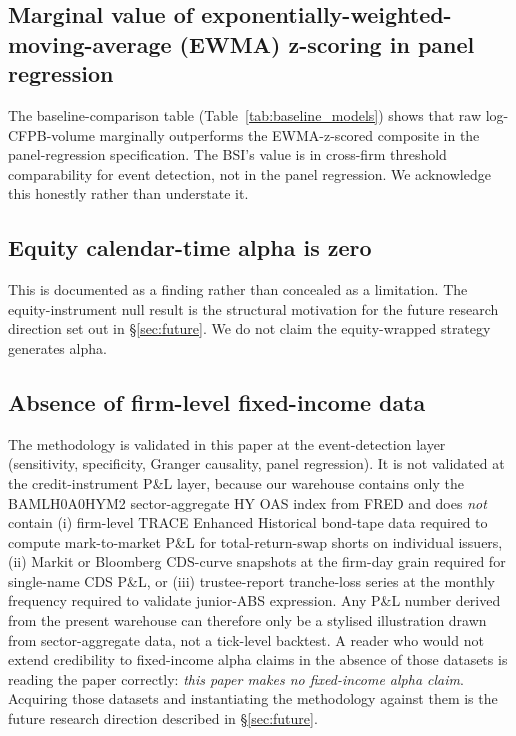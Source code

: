 \documentclass[11pt,a4paper]{article}
\begin{document}
\subsection{Marginal value of exponentially-weighted-moving-average (EWMA) z-scoring in panel regression}

The baseline-comparison table (Table~\ref{tab:baseline_models}) shows that raw log-CFPB-volume marginally outperforms the EWMA-z-scored composite in the panel-regression specification. The BSI's value is in cross-firm threshold comparability for event detection, not in the panel regression. We acknowledge this honestly rather than understate it.

\subsection{Equity calendar-time alpha is zero}

This is documented as a finding rather than concealed as a limitation. The equity-instrument null result is the structural motivation for the future research direction set out in §\ref{sec:future}. We do not claim the equity-wrapped strategy generates alpha.

\subsection{Absence of firm-level fixed-income data}\label{sec:lim_trace}

The methodology is validated in this paper at the event-detection layer (sensitivity, specificity, Granger causality, panel regression). It is not validated at the credit-instrument P\&L layer, because our warehouse contains only the BAMLH0A0HYM2 sector-aggregate HY OAS index from FRED and does \emph{not} contain (i) firm-level TRACE Enhanced Historical bond-tape data required to compute mark-to-market P\&L for total-return-swap shorts on individual issuers, (ii) Markit or Bloomberg CDS-curve snapshots at the firm-day grain required for single-name CDS P\&L, or (iii) trustee-report tranche-loss series at the monthly frequency required to validate junior-ABS expression. Any P\&L number derived from the present warehouse can therefore only be a stylised illustration drawn from sector-aggregate data, not a tick-level backtest. A reader who would not extend credibility to fixed-income alpha claims in the absence of those datasets is reading the paper correctly: \emph{this paper makes no fixed-income alpha claim}. Acquiring those datasets and instantiating the methodology against them is the future research direction described in §\ref{sec:future}.
\end{document}

